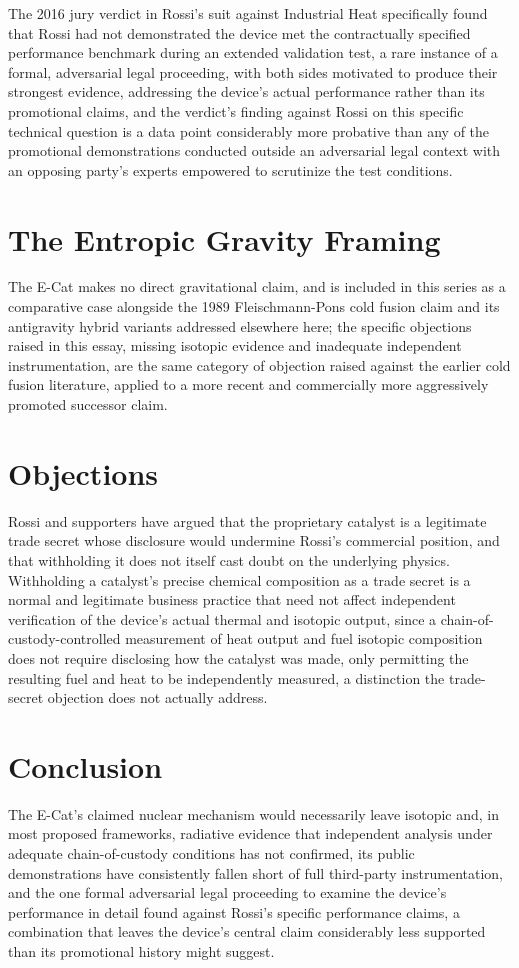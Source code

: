 \documentclass[11pt]{article}
\begin{document}
The 2016 jury verdict in Rossi's suit against Industrial Heat specifically found that Rossi had not demonstrated the device met the contractually specified performance benchmark during an extended validation test, a rare instance of a formal, adversarial legal proceeding, with both sides motivated to produce their strongest evidence, addressing the device's actual performance rather than its promotional claims, and the verdict's finding against Rossi on this specific technical question is a data point considerably more probative than any of the promotional demonstrations conducted outside an adversarial legal context with an opposing party's experts empowered to scrutinize the test conditions.

\section{The Entropic Gravity Framing}

The E-Cat makes no direct gravitational claim, and is included in this series as a comparative case alongside the 1989 Fleischmann-Pons cold fusion claim and its antigravity hybrid variants addressed elsewhere here; the specific objections raised in this essay, missing isotopic evidence and inadequate independent instrumentation, are the same category of objection raised against the earlier cold fusion literature, applied to a more recent and commercially more aggressively promoted successor claim.

\section{Objections}

Rossi and supporters have argued that the proprietary catalyst is a legitimate trade secret whose disclosure would undermine Rossi's commercial position, and that withholding it does not itself cast doubt on the underlying physics. Withholding a catalyst's precise chemical composition as a trade secret is a normal and legitimate business practice that need not affect independent verification of the device's actual thermal and isotopic output, since a chain-of-custody-controlled measurement of heat output and fuel isotopic composition does not require disclosing how the catalyst was made, only permitting the resulting fuel and heat to be independently measured, a distinction the trade-secret objection does not actually address.

\section{Conclusion}

The E-Cat's claimed nuclear mechanism would necessarily leave isotopic and, in most proposed frameworks, radiative evidence that independent analysis under adequate chain-of-custody conditions has not confirmed, its public demonstrations have consistently fallen short of full third-party instrumentation, and the one formal adversarial legal proceeding to examine the device's performance in detail found against Rossi's specific performance claims, a combination that leaves the device's central claim considerably less supported than its promotional history might suggest.
\end{document}
